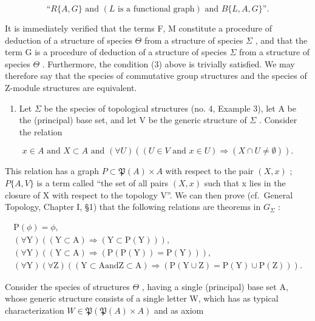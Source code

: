 \[
\text{``}R\{A,G\}\text{ and }(L\text{ is a functional graph})\text{ and }B\{L,A,G\}\text{''.}
\]

It is immediately verified that the terms F, M constitute a procedure of deduction of a structure of species \(\Theta\) from a structure of species \(\Sigma\) , and that the term G is a procedure of deduction of a structure of species \(\Sigma\) from a structure of species \(\Theta\) . Furthermore, the condition (3) above is trivially satisfied. We may therefore say that the species of commutative group structures and the species of Z-module structures are equivalent.

\begin{enumerate}
\def\labelenumi{(\arabic{enumi})}
\setcounter{enumi}{1}
\tightlist
\item
  Let \(\Sigma\) be the species of topological structures (no. 4, Example 3), let A be the (principal) base set, and let V be the generic structure of \(\Sigma\) . Consider the relation
\end{enumerate}

\[
x \in A \text {   and   } X \subset A \text {   and   } (\forall U) ((U \in V \text {   and   } x \in U) \Longrightarrow (X \cap U \neq \emptyset)).
\]

This relation has a graph \(P \subset \mathfrak{P}(A) \times A\) with respect to the pair \((X, x)\) ; \(P\{A, V\}\) is a term called ``the set of all pairs \((X, x)\) such that x lies in the closure of X with respect to the topology V''. We can then prove (cf.~General Topology, Chapter I, §1) that the following relations are theorems in \(G_{\Sigma}\) :

\[
\begin{array}{c} \mathrm{P} (\phi) = \phi , \\ (\forall \mathrm{Y}) ((\mathrm{Y} \subset \mathrm{A}) \Longrightarrow (\mathrm{Y} \subset \mathrm{P} (\mathrm{Y}))), \\ (\forall \mathrm{Y}) ((\mathrm{Y} \subset \mathrm{A}) \Longrightarrow (\mathrm{P} (\mathrm{P} (\mathrm{Y})) = \mathrm{P} (\mathrm{Y}))), \\ (\forall \mathrm{Y}) (\forall \mathrm{Z}) ((\mathrm{Y} \subset \mathrm{A} \text {and} \mathrm{Z} \subset \mathrm{A}) \Longrightarrow (\mathrm{P} (\mathrm{Y} \cup \mathrm{Z}) = \mathrm{P} (\mathrm{Y}) \cup \mathrm{P} (\mathrm{Z}))). \end{array}
\]

Consider the species of structures \(\Theta\) , having a single (principal) base set A, whose generic structure consists of a single letter W, which has as typical characterization \(W \in \mathfrak{P}(\mathfrak{P}(A) \times A)\) and as axiom

